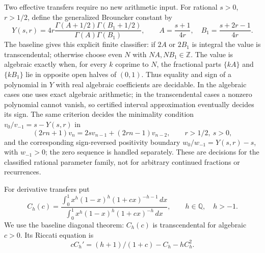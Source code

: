\documentclass[11pt,a4paper]{article}
\theoremstyle{definition}
\theoremstyle{remark}
\numberwithin{equation}{section}
\begin{document}
Two effective transfers require no new arithmetic input.  For rational $s>0$, $r>1/2$, define the generalized Brouncker constant by
\[
 Y(s,r)=4r\frac{\Gamma(A+1/2)\Gamma(B_1+1/2)}
 {\Gamma(A)\Gamma(B_1)},\qquad
 A=\frac{s+1}{4r},\quad B_1=\frac{s+2r-1}{4r}.
\]
The baseline gives this explicit finite classifier: if $2A$ or $2B_1$
is integral the value is transcendental; otherwise choose even $N$
with $NA,NB_1\in\mathbb Z$.  The value is algebraic exactly when,
for every $k$ coprime to $N$, the fractional parts $\{kA\}$ and
$\{kB_1\}$ lie in opposite open halves of $(0,1)$.  Thus equality and sign of a polynomial in $Y$ with
real algebraic coefficients are decidable.  In the algebraic cases one
uses exact algebraic arithmetic; in the transcendental cases a
nonzero polynomial cannot vanish, so certified interval approximation
eventually decides its sign.  The same criterion decides the
minimality condition $v_0/v_{-1}=s-Y(s,r)$ in
\[
 (2rn+1)v_n=2s v_{n-1}+(2rn-1)v_{n-2},
 \qquad r>1/2,\ s>0,
\]
and the corresponding sign-reversed positivity boundary
$w_0/w_{-1}=Y(s,r)-s$, with $w_{-1}>0$; the zero sequence is handled
separately.  These are decisions for the classified rational parameter
family, not for arbitrary continued fractions or recurrences.
\label{tf-decisions}

For derivative transfers put
\[
 C_h(c)=\frac{\int_0^1x^h(1-x)^h(1+cx)^{-h-1}\,dx}
                    {\int_0^1x^h(1-x)^h(1+cx)^{-h}\,dx},
 \qquad h\in\mathbb Q,\quad h>-1.
\]
We use the baseline diagonal theorem: $C_h(c)$ is transcendental for
algebraic $c>0$.  Its Riccati equation is
\begin{equation}\label{tf-riccati}
 cC_h'=(h+1)/(1+c)-C_h-hC_h^2.
\end{equation}
\end{document}
